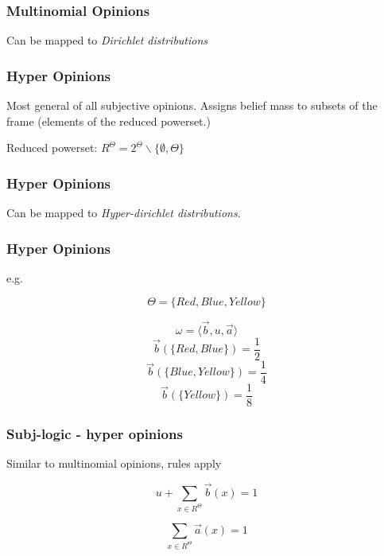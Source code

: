 \documentclass{beamer}
\begin{document}

\begin{frame}
\frametitle{Multinomial Opinions}

Can be mapped to \emph{Dirichlet distributions}

\end{frame}


\begin{frame}
\frametitle{Hyper Opinions}

Most general of all subjective opinions. Assigns belief mass to subsets of the
frame (elements of the reduced powerset.)

Reduced powerset: $R^\Theta = 2^\Theta \backslash \lbrace \emptyset, \Theta \rbrace$

\end{frame}


\begin{frame}
\frametitle{Hyper Opinions}

Can be mapped to \emph{Hyper-dirichlet distributions}.

\end{frame}


\begin{frame}
\frametitle{Hyper Opinions}

e.g.

$$\Theta = \lbrace Red, Blue, Yellow \rbrace$$

$$\omega = \langle \vec{b}, u, \vec{a} \rangle$$
$$\vec{b}\left(\lbrace Red, Blue \rbrace \right) = \frac{1}{2}$$
$$\vec{b}\left(\lbrace Blue, Yellow \rbrace \right) = \frac{1}{4}$$
$$\vec{b}\left(\lbrace Yellow \rbrace \right) = \frac{1}{8}$$

\end{frame}


\begin{frame}
\frametitle{Subj-logic - hyper opinions}

Similar to multinomial opinions, rules apply

$$u + \sum_{x \in R^\Theta} \vec{b}\left(x\right) = 1$$

$$\sum_{x \in R^\Theta} \vec{a}\left(x\right) = 1$$

\end{frame}
\end{document}
